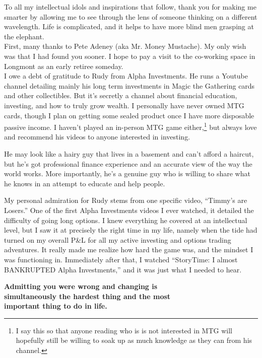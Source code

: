 To all my intellectual idols and inspirations that follow, thank you for making me smarter by allowing me to see through the lens of someone thinking on a different wavelength. Life is complicated, and it helps to have more blind men grasping at the elephant.\\

First, many thanks to Pete Adeney (aka Mr. Money Mustache). My only wish was that I had found you sooner. I hope to pay a visit to the co-working space in Longmont as an early retiree someday.\\

I owe a debt of gratitude to Rudy from Alpha Investments. He runs a Youtube channel detailing mainly his long term investments in Magic the Gathering cards and other collectibles. But it’s secretly a channel about financial education, investing, and how to truly grow wealth. I personally have never owned MTG cards, though I plan on getting some sealed product once I have more disposable passive income. I haven't played an in-person MTG game either,\footnote{I say this so that anyone reading who is is not interested in MTG will hopefully still be willing to soak up as much knowledge as they can from his channel.} but always love and recommend his videos to anyone interested in investing.

He may look like a hairy guy that lives in a basement and can’t afford a haircut, but he’s got professional finance experience and an accurate view of the way the world works. More importantly, he’s a genuine guy who is willing to share what he knows in an attempt to educate and help people.

My personal admiration for Rudy stems from one specific video, “Timmy’s are Losers.” One of the first Alpha Investments videos I ever watched, it detailed the difficulty of going long options. I knew everything he covered at an intellectual level, but I saw it at precisely the right time in my life, namely when the tide had turned on my overall P\&L for all my active investing and options trading adventures. It really made me realize how hard the game was, and the mindset I was functioning in. Immediately after that, I watched “StoryTime: I almost BANKRUPTED Alpha Investments,” and it was just what I needed to hear.

\begin{center}
\fbox
{
\begin{minipage}{0.90\textwidth}
    \textbf{Admitting you were wrong and changing is\\ simultaneously the hardest thing and the most\\ important thing to do in life.} 
\end{minipage}
} 
\end{center}


